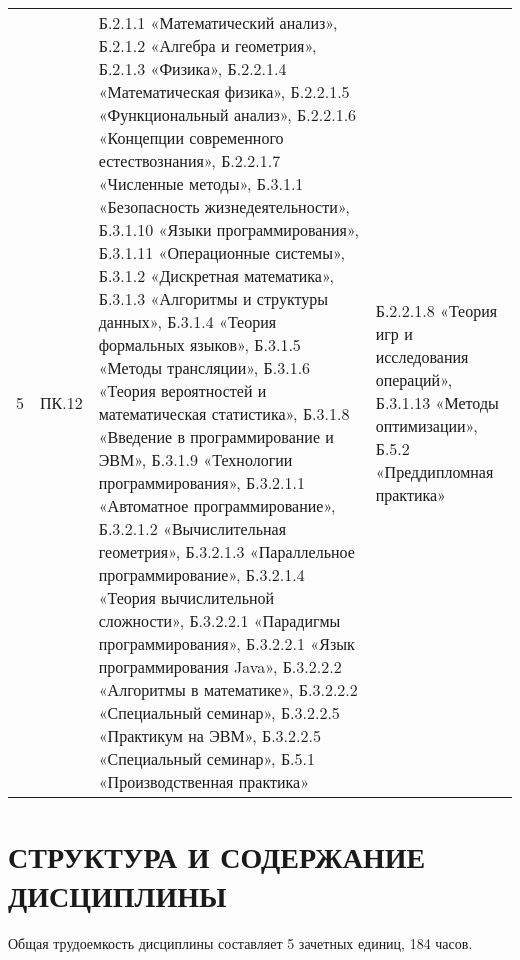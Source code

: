 \begin{center}
\begin{longtable}{|c|p{}|p{}|p{}|}
5 & ПК.12 & Б.2.1.1 «Математический анализ», Б.2.1.2 «Алгебра и геометрия», Б.2.1.3 «Физика», Б.2.2.1.4 «Математическая физика», Б.2.2.1.5 «Функциональный анализ», Б.2.2.1.6 «Концепции современного естествознания», Б.2.2.1.7 «Численные методы», Б.3.1.1 «Безопасность жизнедеятельности», Б.3.1.10 «Языки программирования», Б.3.1.11 «Операционные системы», Б.3.1.2 «Дискретная математика», Б.3.1.3 «Алгоритмы и структуры данных», Б.3.1.4 «Теория формальных языков», Б.3.1.5 «Методы трансляции», Б.3.1.6 «Теория вероятностей и математическая статистика», Б.3.1.8 «Введение в программирование и ЭВМ», Б.3.1.9 «Технологии программирования», Б.3.2.1.1 «Автоматное программирование», Б.3.2.1.2 «Вычислительная геометрия», Б.3.2.1.3 «Параллельное программирование», Б.3.2.1.4 «Теория вычислительной сложности», Б.3.2.2.1 «Парадигмы программирования», Б.3.2.2.1 «Язык программирования Java», Б.3.2.2.2 «Алгоритмы в математике», Б.3.2.2.2 «Специальный семинар», Б.3.2.2.5 «Практикум на ЭВМ», Б.3.2.2.5 «Специальный семинар», Б.5.1 «Производственная практика» & Б.2.2.1.8 «Теория игр и исследования операций», Б.3.1.13 «Методы оптимизации», Б.5.2 «Преддипломная практика»\hline

\end{longtable}

\newpage
\section{СТРУКТУРА И СОДЕРЖАНИЕ ДИСЦИПЛИНЫ}
Общая трудоемкость дисциплины составляет 5 зачетных единиц, 184 часов.


\end{center}
